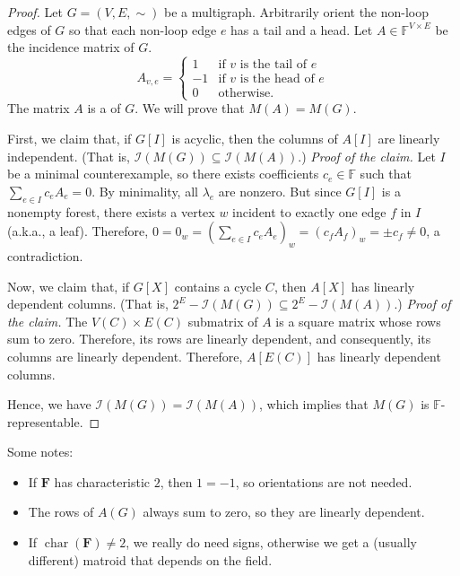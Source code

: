\begin{proof}
    Let \(G = (V, E, \sim)\) be a multigraph.
    Arbitrarily orient the non-loop edges of \(G\) so that each non-loop edge \(e\) has a tail and a head.
    Let \(A \in \mathbb{F}^{V \times E}\) be the incidence matrix of \(G\).
    \begin{equation}
        A_{v, e} = \begin{cases}
            1 & \text{if } v \text{ is the tail of } e \\
            -1 & \text{if } v \text{ is the head of } e \\
            0 & \text{otherwise.}
        \end{cases}
    \end{equation}
    The matrix \(A\) is a  of \(G\).
    We will prove that \(M(A) = M(G)\).

    First, we claim that, if \(G[I]\) is acyclic, then the columns of \(A[I]\) are linearly independent. (That is, \(\mathcal{I}(M(G)) \subseteq \mathcal{I}(M(A))\).)
    \textit{Proof of the claim.}
    Let \(I\) be a minimal counterexample, so there exists coefficients \(c_e \in \mathbb{F}\) such that \(\sum_{e \in I} c_e A_{e} = 0\).
    By minimality, all \(\lambda_e\) are nonzero.
    But since \(G[I]\) is a nonempty forest, there exists a vertex \(w\) incident to exactly one edge \(f\) in \(I\) (a.k.a., a leaf).
    Therefore, \(0 = 0_w = (\sum_{e \in I} c_e A_{e})_{w} = (c_fA_{f})_w = \pm c_f \neq 0\), a contradiction.

    Now, we claim that, if \(G[X]\) contains a cycle \(C\), then \(A[X]\) has linearly dependent columns. (That is, \(2^E - \mathcal{I}(M(G)) \subseteq 2^E - \mathcal{I}(M(A))\).)
    \textit{Proof of the claim.}
    The \(V(C) \times E(C)\) submatrix of \(A\) is a square matrix whose rows sum to zero.
    Therefore, its rows are linearly dependent, and consequently, its columns are linearly dependent.
    Therefore, \(A[E(C)]\) has linearly dependent columns.

    Hence, we have \(\mathcal{I}(M(G)) = \mathcal{I}(M(A))\), which implies that \(M(G)\) is \(\mathbb{F}\)-representable.
\end{proof}

Some notes:
\begin{itemize}
    \item If \(\mathbf{F}\) has characteristic \(2\), then \(1 = -1\), so orientations are not needed.
    \item The rows of \(A(G)\) always sum to zero, so they are linearly dependent.
    \item If \(\operatorname{char}(\mathbf{F}) \neq 2\), we really do need signs, otherwise we get a (usually different) matroid that depends on the field.
\end{itemize}

